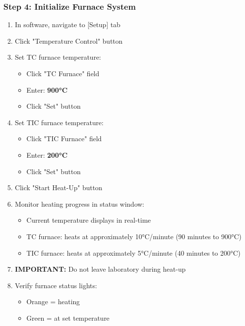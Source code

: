 \documentclass[11pt,a4paper]{article}\usepackage[]{graphicx}\usepackage[]{xcolor}
\begin{document}
\subsubsection{Step 4: Initialize Furnace System}
\begin{enumerate}[noitemsep]
    \item In software, navigate to [Setup] tab
    \item Click "Temperature Control" button
    \item Set TC furnace temperature:
    \begin{itemize}
        \item Click "TC Furnace" field
        \item Enter: \textbf{900°C}
        \item Click "Set" button
    \end{itemize}
    \item Set TIC furnace temperature:
    \begin{itemize}
        \item Click "TIC Furnace" field
        \item Enter: \textbf{200°C}
        \item Click "Set" button
    \end{itemize}
    \item Click "Start Heat-Up" button
    \item Monitor heating progress in status window:
    \begin{itemize}
        \item Current temperature displays in real-time
        \item TC furnace: heats at approximately 10°C/minute (90 minutes to 900°C)
        \item TIC furnace: heats at approximately 5°C/minute (40 minutes to 200°C)
    \end{itemize}
    \item \textbf{IMPORTANT:} Do not leave laboratory during heat-up
    \item Verify furnace status lights:
    \begin{itemize}
        \item Orange = heating
        \item Green = at set temperature
    \end{itemize}
\end{enumerate}
\end{document}
